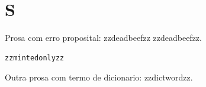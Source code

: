 \section{S}

Prosa com erro proposital: zzdeadbeefzz zzdeadbeefzz.

\begin{verbatim}
zzmintedonlyzz
\end{verbatim}

Outra prosa com termo de dicionario: zzdictwordzz.
